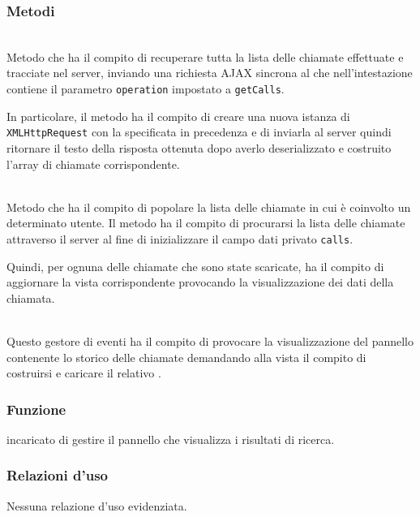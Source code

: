 \subsubsection*{Metodi}
\begin{description}

  \item{}\\
  Metodo che ha il compito di recuperare tutta la lista delle chiamate effettuate e tracciate nel server, inviando una richiesta AJAX sincrona al  che nell'intestazione contiene il parametro \verb'operation' impostato a \verb'getCalls'.
  
  In particolare, il metodo ha il compito di creare una nuova istanza di \verb'XMLHttpRequest' con la  specificata in precedenza e di inviarla al server quindi ritornare il testo della risposta ottenuta dopo averlo deserializzato e costruito l'array di chiamate corrispondente.
  
  \item{}\\
  Metodo che ha il compito di popolare la lista delle chiamate in cui è coinvolto un determinato utente. Il metodo ha il compito di procurarsi la lista delle chiamate attraverso il server al fine di inizializzare il campo dati privato \verb'calls'.
  
  Quindi, per ognuna delle chiamate che sono state scaricate, ha il compito di aggiornare la vista corrispondente provocando la visualizzazione dei dati della chiamata.
  
  \item{}\\
  Questo gestore di eventi ha il compito di provocare la visualizzazione del pannello contenente lo storico delle chiamate demandando alla vista il compito di costruirsi e caricare il relativo .

\end{description}


\subsubsection*{Funzione}
 incaricato di gestire il pannello che visualizza i risultati di ricerca.

\subsubsection*{Relazioni d'uso}
Nessuna relazione d'uso evidenziata.

